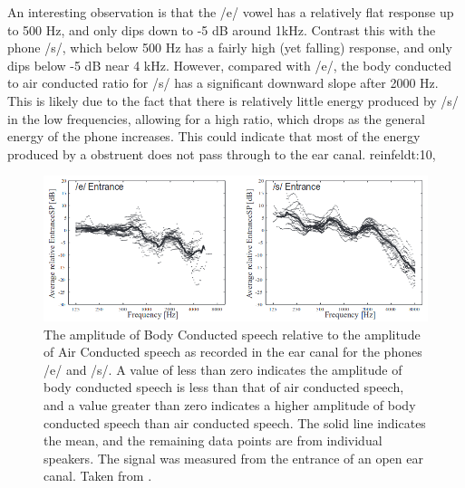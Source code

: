 \documentclass[dissertation,copyright]{uathesis}
\begin{document}
An interesting observation is that the /e/ vowel has a relatively flat response up to 500 Hz, and only dips down to -5 dB around 1kHz.  Contrast this with the phone /s/, which below 500 Hz has a fairly high (yet falling) response, and only dips below -5 dB near 4 kHz.  However, compared with /e/, the body conducted to air conducted ratio for /s/ has a significant downward slope after 2000 Hz.  This is likely due to the fact that there is relatively little energy produced by /s/ in the low frequencies, allowing for a high ratio, which drops as the general energy of the phone increases.  This could indicate that most of the energy produced by a obstruent does not pass through to the ear canal.
reinfeldt:10,
\begin{figure}
\includegraphics[width=1\textwidth]{figure/BCrelAC_e_s.png}
\caption{The amplitude of Body Conducted speech relative to the amplitude of Air Conducted  speech as recorded in the ear canal for the phones /e/ and /s/.  A value of less than zero indicates the amplitude of body conducted speech is less than that of air conducted speech, and a value greater than zero indicates a higher amplitude of body conducted speech than air conducted speech. The solid line indicates the mean, and the remaining data points are from individual speakers.  The signal was measured from the entrance of an open ear canal.  Taken from \cite{reinfeldt:10}.}
\label{BCrelAC}
\end{figure}
\end{document}
